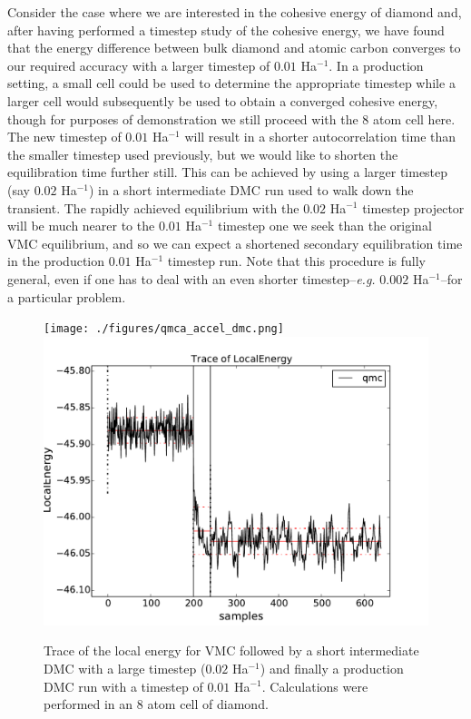 Consider the case where we are interested in the cohesive energy of 
diamond and, after having performed a timestep study of the cohesive 
energy, we have found that the energy difference between bulk diamond 
and atomic carbon converges to our required accuracy with a larger 
timestep of $0.01$ Ha$^{-1}$.  In a production setting, a small cell 
could be used to determine  the appropriate timestep while a larger 
cell would subsequently be used to obtain a converged cohesive energy, 
though for purposes of demonstration we still proceed with the 8 atom 
cell here.  The new timestep of $0.01$ Ha$^{-1}$ will result in a shorter 
autocorrelation time than the smaller timestep used previously, but 
we would like to shorten the equilibration time further still.  This 
can be achieved by using a larger timestep (say $0.02$ Ha$^{-1}$) in a 
short intermediate DMC run used to walk down the transient.  The 
rapidly achieved equilibrium with the $0.02$ Ha$^{-1}$ timestep 
projector will be much nearer to the $0.01$ Ha$^{-1}$ timestep one 
we seek than the original VMC equilibrium, and so we can expect 
a shortened secondary equilibration time in the production 
$0.01$ Ha$^{-1}$ timestep run. Note that this procedure is fully 
general, even if one has to deal with an even shorter 
timestep--\emph{e.g.} $0.002$ Ha$^{-1}$--for a particular problem.

\begin{figure}
\begin{center}
\ifdefined\HCode  
\texttt{[image: ./figures/qmca\_accel\_dmc.png]}
\else
\includegraphics[trim = 0mm 0mm 0mm 0mm, clip,width=0.75\columnwidth]{./figures/qmca_accel_dmc.pdf}
\fi
\end{center}
\caption{Trace of the local energy for VMC followed by a short intermediate DMC with a large timestep ($0.02$ Ha$^{-1}$) and finally a production DMC run with a timestep of $0.01$ Ha$^{-1}$.  Calculations were performed in an 8 atom cell of diamond.} 
\label{fig:qmca_accel_dmc}
\end{figure}

